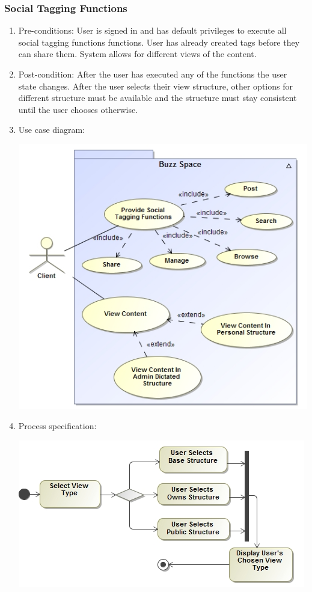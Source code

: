 \documentclass[hidelinks, 12pt, oneside]{article}
\begin{document}
\subsubsection{Social Tagging Functions}
\begin{enumerate}
\item Pre-conditions: User is signed in and has default privileges to execute all social tagging functions functions. User has already created tags before they can share them. System allows for different views of the content.
\item Post-condition: After the user has executed any of the functions the user state changes. After the user selects their view structure, other options for different structure must be available and the structure must stay consistent until the user chooses otherwise.
\item Use case diagram:\\
\centerline{\includegraphics[scale=0.5]{socialTagging.jpg}}
    \item Process specification:\\ 
\centerline{\includegraphics[scale=0.5]{socialTaggingActivity.jpg}}

\end{enumerate}
\end{document}
